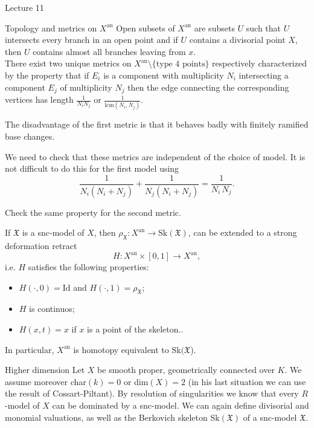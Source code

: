 
\begin{section}{Lecture 11}
\begin{subsection}{Topology and metrics on $X^{\textrm{an}}$}
Open subsets of $X^{\textrm{an}}$ are subsets $U$ such that $U$ intersects every branch in an open point and if $U$ contains a divisorial point $X$, then $U$ contains almost all branches leaving from $x$. \\

There exist two unique metrics on $X^{\textrm{an}} \setminus \{\textrm{type $4$ points}\}$ respectively characterized by the property that if $E_i$ is a component with multiplicity $N_i$ intersecting a component $E_j$ of multiplicity $N_j$ then the edge connecting the corresponding vertices has length  $\frac{1}{N_iN_j}$ or $\frac{1}{\textrm{lcm}(N_i,N_j)}$. 

\begin{remark} The disadvantage of the first metric is that it behaves badly with finitely ramified base changes. 
\end{remark}


We need to check that these metrics are independent of the choice of model. It is not difficult to do this for the first model using
\[
\frac{1}{N_i(N_i+N_j)} + \frac{1}{N_j(N_i+N_j)} = \frac{1}{N_i \, N_j}. 
\]
\begin{exercise} Check the same property for the second metric.
\end{exercise}
\begin{theorem} 
If $\mathfrak{X}$ is a snc-model of $X$, then $\rho_{\mathfrak{X}}: X^{\textrm{an}} \rightarrow \textrm{Sk}(\mathfrak{X})$, can be extended to a strong deformation retract 
\[
H: X^{\textrm{an}} \times [0,1] \rightarrow X^{\textrm{an}}, 
\]
i.e. $H$ satisfies the following properties: 
\begin{itemize}
\item $H(\cdot, 0) = \textrm{Id}$ and $H(\cdot, 1) = \rho_{\mathfrak{X}}$;
\item $H$ is continuos;
\item $H(x,t)=x$ if $x$ is a point of the skeleton..
\end{itemize} 

In particular, $X^{\textrm{an}}$ is homotopy equivalent to Sk$(\mathfrak{X}$). \\
\end{theorem} 
\end{subsection}
\begin{subsection}{Higher dimension}
Let $X$ be smooth proper, geometrically connected over $K$. We assume moreover char$(k) = 0$ or dim$(X) = 2$ (in his last situation we can use the result of Cossart-Piltant). By resolution of singularities we know that every $R$-model of $X$ can be dominated by a snc-model. We can again define divisorial and monomial valuations, as well as the Berkovich skeleton Sk$(\mathfrak{X})$ of a snc-model $\mathfrak{X}$. 


\end{subsection}
\end{section}
